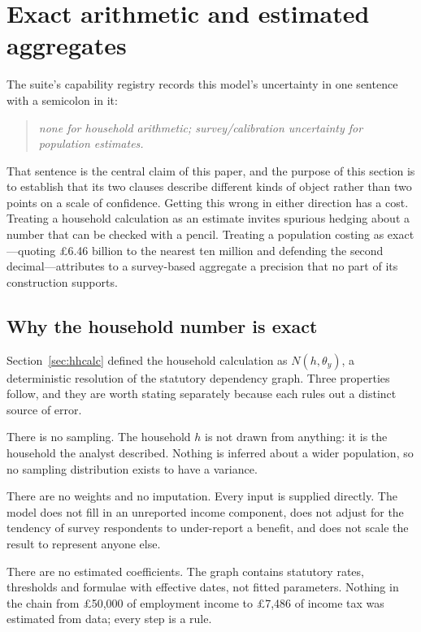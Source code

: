 \section{Exact arithmetic and estimated aggregates}
\label{sec:uncertainty}

The suite's capability registry records this model's uncertainty in one sentence with a semicolon in it:

\begin{quote}
\emph{none for household arithmetic; survey/calibration uncertainty for population estimates.}
\end{quote}

That sentence is the central claim of this paper, and the purpose of this section is to establish that its two clauses describe different kinds of object rather than two points on a scale of confidence. Getting this wrong in either direction has a cost. Treating a household calculation as an estimate invites spurious hedging about a number that can be checked with a pencil. Treating a population costing as exact---quoting \pounds 6.46 billion to the nearest ten million and defending the second decimal---attributes to a survey-based aggregate a precision that no part of its construction supports.

\subsection{Why the household number is exact}

Section~\ref{sec:hhcalc} defined the household calculation as $N(h, \theta_y)$, a deterministic resolution of the statutory dependency graph. Three properties follow, and they are worth stating separately because each rules out a distinct source of error.

There is no sampling. The household $h$ is not drawn from anything: it is the household the analyst described. Nothing is inferred about a wider population, so no sampling distribution exists to have a variance.

There are no weights and no imputation. Every input is supplied directly. The model does not fill in an unreported income component, does not adjust for the tendency of survey respondents to under-report a benefit, and does not scale the result to represent anyone else.

There are no estimated coefficients. The graph contains statutory rates, thresholds and formulae with effective dates, not fitted parameters. Nothing in the chain from \pounds 50{,}000 of employment income to \pounds 7{,}486 of income tax was estimated from data; every step is a rule.

